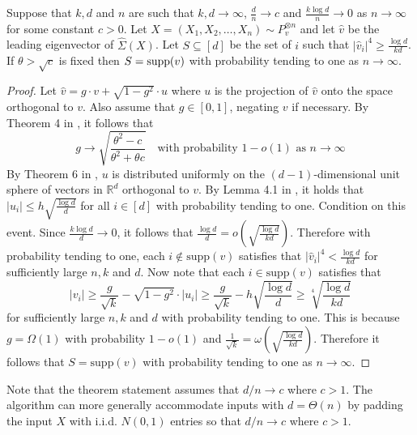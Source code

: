 \begin{theorem}
Suppose that $k, d$ and $n$ are such that $k, d \to \infty$, $\frac{d}{n} \to c$ and $\frac{k \log d}{n} \to 0$ as $n \to \infty$ for some constant $c > 0$. Let $X = (X_1, X_2, \dots, X_n) \sim P_v^{\otimes n}$ and let $\hat{v}$ be the leading eigenvector of $\hat{\Sigma}(X)$. Let $S \subseteq [d]$ be the set of $i$ such that $|\hat{v}_i|^4 \ge \frac{\log d}{kd}$. If $\theta > \sqrt{c}$ is fixed then $S = \textnormal{supp}(v)$ with probability tending to one as $n \to \infty$.
\end{theorem}

\begin{proof}
Let $\hat{v} = g \cdot v + \sqrt{1 - g^2} \cdot u$ where $u$ is the projection of $\hat{v}$ onto the space orthogonal to $v$. Also assume that $g \in [0, 1]$, negating $v$ if necessary. By Theorem 4 in \cite{paul2007asymptotics}, it follows that
$$g \to \sqrt{\frac{\theta^2 - c}{\theta^2 + \theta c}} \quad \text{with probability } 1 - o(1) \text{ as } n \to \infty$$
By Theorem 6 in \cite{paul2007asymptotics}, $u$ is distributed uniformly on the $(d - 1)$-dimensional unit sphere of vectors in $\mathbb{R}^d$ orthogonal to $v$. By Lemma 4.1 in \cite{krauthgamer2015semidefinite}, it holds that $|u_i| \le h \sqrt{\frac{\log d}{d}}$ for all $i \in [d]$ with probability tending to one. Condition on this event. Since $\frac{k\log d}{d} \to 0$, it follows that $\frac{\log d}{d} = o\left( \sqrt{\frac{\log d}{kd}} \right)$. Therefore with probability tending to one, each $i \not \in \text{supp}(v)$ satisfies that $|\hat{v}_i|^4 < \frac{\log d}{kd}$ for sufficiently large $n, k$ and $d$. Now note that each $i \in \text{supp}(v)$ satisfies that
$$|v_i| \ge \frac{g}{\sqrt{k}} - \sqrt{1 - g^2} \cdot |u_i| \ge \frac{g}{\sqrt{k}} - h \sqrt{\frac{\log d}{d}} \ge \sqrt[4]{\frac{\log d}{kd}}$$
for sufficiently large $n, k$ and $d$ with probability tending to one. This is because $g = \Omega(1)$ with probability $1 - o(1)$ and $\frac{1}{\sqrt{k}} = \omega\left( \sqrt{\frac{\log d}{kd}} \right)$. Therefore it follows that $S = \text{supp}(v)$ with probability tending to one as $n \to \infty$.
\end{proof}

Note that the theorem statement assumes that $d/n \to c$ where $c > 1$. The algorithm can more generally accommodate inputs with $d = \Theta(n)$ by padding the input $X$ with i.i.d. $N(0, 1)$ entries so that $d/n \to c$ where $c > 1$.
